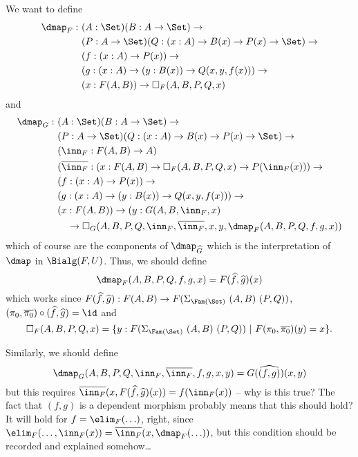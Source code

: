 \documentclass{article}
\begin{document}
We want to define
\begin{align*}
\dmap_F :\ & (A : \Set)(B : A \to \Set) \to \\
           & (P : A \to \Set)(Q : (x : A) \to B(x) \to P(x) \to \Set) \to \\
           & (f : (x : A) \to P(x)) \to \\ 
           & (g : (x : A) \to (y : B(x)) \to Q(x, y, f(x))) \to \\
           & (x : F(A, B)) \to \square_F(A, B, P, Q, x)
\end{align*}
and
\begin{align*}
\dmap_G :\ & (A : \Set)(B : A \to \Set) \to \\
           & (P : A \to \Set)(Q : (x : A) \to B(x) \to P(x) \to \Set) \to \\
           & (\inn_F : F(A, B) \to A) \\
           & (\overline{\inn_F} : (x : F(A, B) \to \square_F(A, B, P, Q, x) \to P(\inn_F(x))) \to \\
           & (f : (x : A) \to P(x)) \to \\ 
           & (g : (x : A) \to (y : B(x)) \to Q(x, y, f(x))) \to \\
           & (x : F(A, B)) \to (y : G(A, B, \inn_F, x) \\ 
           & \quad \to \square_G(A, B, P, Q, \inn_F, \overline{\inn_F}, x, y, \dmap_F(A, B, P, Q, f, g, x))
\end{align*}
which of course are the components of $\dmap_{\widehat{G}}$ which is
the interpretation of $\dmap$ in $\Bialg(F, U)$. Thus, we should
define
\[
\dmap_F(A, B, P, Q, f, g, x) = F(\widehat{f}, \widehat{g})(x)
\]
which works since $F(\widehat{f}, \widehat{g}) : F(A, B) \to
F(\Sigma_{\Fam(\Set)}\ (A, B)\ (P, Q))$, $(\pi_0, \overline{\pi_0})
\circ (\widehat{f}, \widehat{g}) = \id$ and 
\[
\square_F(A, B, P, Q, x)
= \{ y : F(\Sigma_{\Fam(\Set)}\ (A, B)\ (P, Q))\ |\ F(\pi_0,\overline{\pi_0})(y) = x\}.
\]

Similarly, we should define
\[
\dmap_G(A, B, P, Q, \inn_F, \overline{\inn_F}, f, g, x, y) = G(\widehat{(f, g)})(x, y)
\]
but this requires $\overline{\inn_F}(x, F(\widehat{f},
\widehat{g})(x)) = f(\inn_F(x))$ -- why is this true? The fact that
$(f, g)$ is a dependent morphism probably means that this should hold?
It will hold for $f = \elim_F(\ldots)$, right, since $\elim_F(\ldots,
\inn_F(x)) = \overline{\inn_F}(x, \dmap_F(\ldots))$, but this
condition should be recorded and explained somehow\ldots
\end{document}
